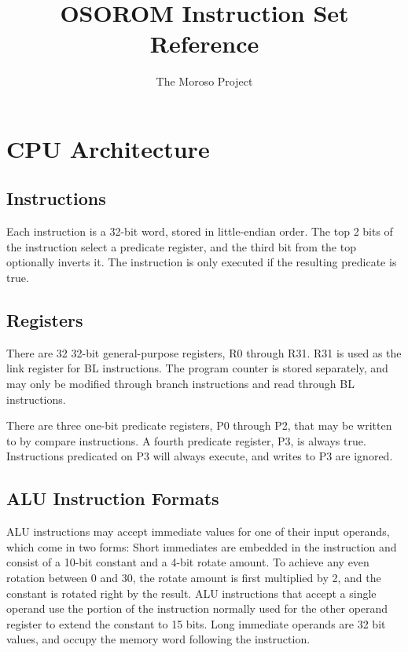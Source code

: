 \documentclass[11pt,openany]{report}
\title{OSOROM Instruction Set Reference}
\author{The Moroso Project}
\begin{document}
\maketitle
\tableofcontents

\chapter{CPU Architecture}

\section{Instructions}
Each instruction is a 32-bit word, stored in little-endian order. The top 2 bits of the instruction select a predicate register, and the third bit from the top optionally inverts it. The instruction is only executed if the resulting predicate is true.



\section{Registers}
There are 32 32-bit general-purpose registers, R0 through R31. R31 is used as the link register for BL instructions. The program counter is stored separately, and may only be modified through branch instructions and read through BL instructions. 

There are three one-bit predicate registers, P0 through P2, that may be written to by compare instructions. A fourth predicate register, P3, is always true. Instructions predicated on P3 will always execute, and writes to P3 are ignored.

\section{ALU Instruction Formats}

ALU instructions may accept immediate values for one of their input operands, which come in two forms: Short immediates are embedded in the instruction and consist of a 10-bit constant and a 4-bit rotate amount. To achieve any even rotation between 0 and 30, the rotate amount is first multiplied by 2, and the constant is rotated right by the result. ALU instructions that accept a single operand use the portion of the instruction normally used for the other operand register to extend the constant to 15 bits. Long immediate operands are 32 bit values, and occupy the memory word following the instruction.
\end{document}
